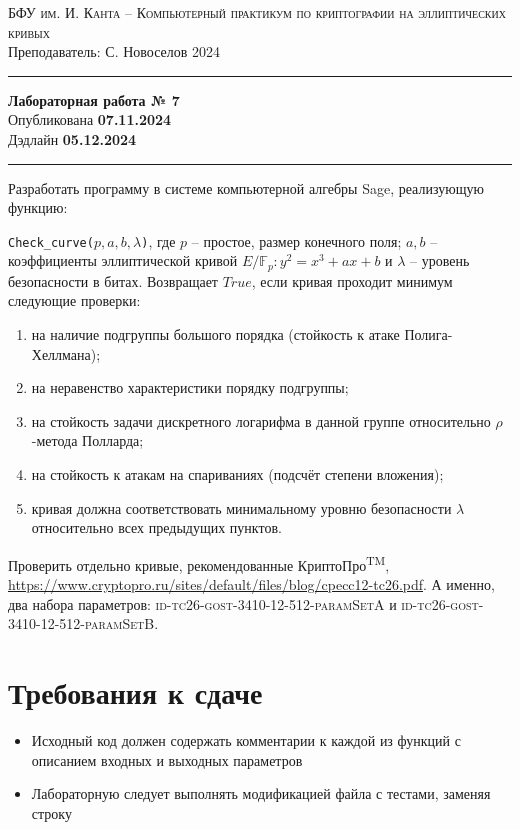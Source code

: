 \documentclass[11pt]{exam}
\theoremstyle{definition}
\begin{document}
	
	{\noindent
		\textsc{БФУ им. И. Канта -- Компьютерный практикум по криптографии на эллиптических кривых }\\[5pt]
		Преподаватель: {С. Новоселов}   \hfill{2024\\}
	\hrule
	\begin{center}
		{\LARGE\textbf{
				Лабораторная работа № 7 \\[5pt]
		}} 
			Опубликована \textbf{07.11.2024} \\[5pt] 
			Дэдлайн \textbf{05.12.2024}
		
	\end{center}
	\hrule \vspace{5mm}
	
	\thispagestyle{empty}
	
	Разработать программу в системе компьютерной алгебры Sage, реализующую функцию:
    
        \texttt{Check\_curve($p, a, b, \lambda$)}, где $p$ -- простое, размер конечного поля; $a, b$ -- коэффициенты эллиптической кривой $E/\mathbb{F}_p: y^2 = x^3 + a x + b$ и  $\lambda$ -- уровень безопасности в битах. Возвращает $True$, если кривая проходит минимум следующие проверки:
        \begin{enumerate}
            \item на наличие подгруппы большого порядка (стойкость к атаке Полига-Хеллмана);
            \item на неравенство характеристики порядку подгруппы;
            \item на стойкость задачи дискретного логарифма в данной группе относительно $\rho$-метода Полларда;
            \item на стойкость к атакам на спариваниях (подсчёт степени вложения);
            \item кривая должна соответствовать минимальному уровню безопасности $\lambda$ относительно всех предыдущих пунктов.
        \end{enumerate}
    
    Проверить отдельно кривые, рекомендованные КриптоПро\textsuperscript{TM}, \url{https://www.cryptopro.ru/sites/default/files/blog/cpecc12-tc26.pdf}. А именно, два набора параметров: \textsc{ id-tc26-gost-3410-12-512-paramSetA} и \textsc{id-tc26-gost-3410-12-512-paramSetB}.
    
    
\normalsize
\section*{Требования к сдаче}
\begin{itemize}
    \item Исходный код должен содержать комментарии к каждой из функций с описанием входных и выходных параметров
    \item Лабораторную следует выполнять модификацией файла с тестами, заменяя строку
    

\end{itemize}}
\end{document}
